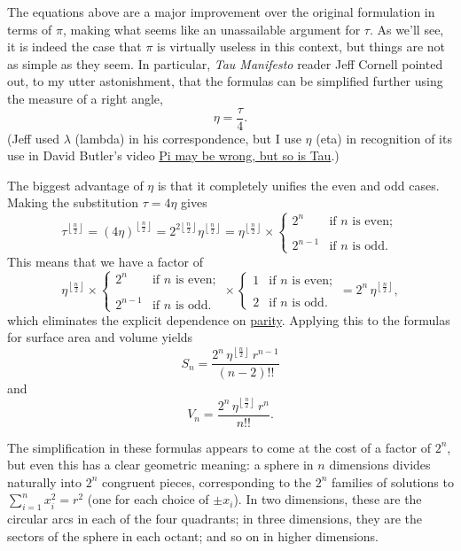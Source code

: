The equations above are a major improvement over the original formulation in terms of $\pi$, making what seems like an unassailable argument for $\tau$. As we'll see, it is indeed the case that $\pi$ is virtually useless in this context, but things are not as simple as they seem. In particular, \emph{Tau Manifesto} reader Jeff Cornell pointed out, to my utter astonishment, that the formulas can be simplified further using the measure of a right angle,
\[
\eta = \frac{\tau}{4}.
\]
(Jeff used $\lambda$ (lambda) in his correspondence, but I use $\eta$ (eta) in recognition of its use in David Butler's video \href{http://youtu.be/1qpVdwizdvI}{Pi may be wrong, but so is Tau}.)

The biggest advantage of $\eta$ is that it completely unifies the even and odd cases. Making the substitution $\tau = 4\eta$ gives
\[
\tau^{\left\lfloor \frac{n}{2} \right\rfloor} = (4\eta)^{\left\lfloor \frac{n}{2} \right\rfloor} = 2^{2\left\lfloor \frac{n}{2} \right\rfloor} \eta^{\left\lfloor \frac{n}{2} \right\rfloor} =
\eta^{\left\lfloor \frac{n}{2} \right\rfloor}\times
\begin{cases}
 2^n & \text{if } n \text{ is even}; \\ \\
 2^{n-1} & \text{if } n \text{ is odd}.
 \end{cases}
\]
This means that we have a factor of
\[
 \eta^{\left\lfloor \frac{n}{2} \right\rfloor} \times
\begin{cases}
 2^n & \text{if } n \text{ is even}; \\ \\
 2^{n-1} & \text{if } n \text{ is odd}.
 \end{cases}
  \times \begin{cases}
 1 & \text{if } n \text{ is even}; \\ \\
 2 & \text{if } n \text{ is odd}.
 \end{cases}
 = 2^n\,\eta^{\left\lfloor \frac{n}{2} \right\rfloor},
\]
which eliminates the explicit dependence on \href{http://en.wikipedia.org/wiki/Parity_(mathematics)}{parity}. Applying this to the formulas for surface area and volume yields
\[ S_n = \frac{2^n\,\eta^{\left\lfloor \frac{n}{2} \right\rfloor}\,r^{n-1}}{(n-2)!!}
\]
and
\[ V_n = \frac{2^n\,\eta^{\left\lfloor \frac{n}{2} \right\rfloor}\,r^n}{n!!}.
\]

The simplification in these formulas appears to come at the cost of a factor of $2^n$, but even this has a clear geometric meaning: a sphere in $n$ dimensions divides naturally into $2^n$ congruent pieces, corresponding to the $2^n$ families of solutions to $\sum_{i=1}^{n} x_i^2 = r^2$ (one for each choice of $\pm x_i$). In two dimensions, these are the circular arcs in each of the four quadrants; in three dimensions, they are the sectors of the sphere in each octant; and so on in higher dimensions.

